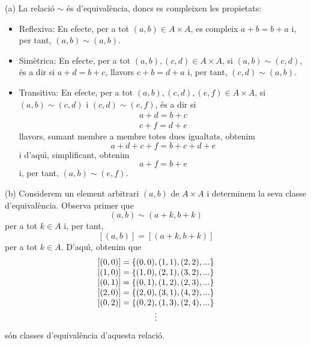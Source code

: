 \begin{solucio}
(a) La relaci\'{o} $\sim $ \'{e}s d'equival\`{e}ncia, doncs es compleixen
les propietats:

\begin{itemize}
\item Reflexiva: En efecte, per a tot $(a,b)\in A\times A$, es compleix $%
a+b=b+a$ i, per tant, $(a,b)\sim (a,b)$.

\item Sim\`{e}trica: En efecte, per a tot $(a,b),(c,d)\in A\times A$, si $%
(a,b)\sim (c,d)$, \'{e}s a dir si $a+d=b+c$, llavors $c+b=d+a$ i, per tant, $%
(c,d)\sim (a,b)$.

\item Transitiva: En efecte, per a tot $(a,b),(c,d),(e,f)\in A\times A$, si $%
(a,b)\sim (c,d)$ i $(c,d)\sim (e,f)$, \'{e}s a dir si%
\begin{equation*}
\begin{array}{c}
a+d=b+c \\
c+f=d+e%
\end{array}%
\end{equation*}%
llavors, sumant membre a membre totes dues igualtats, obtenim%
\begin{equation*}
a+d+c+f=b+c+d+e
\end{equation*}%
i d'aqu\'{\i}, simplificant, obtenim%
\begin{equation*}
a+f=b+e
\end{equation*}%
i, per tant, $(a,b)\sim (e,f)$.
\end{itemize}

(b) Considerem un element arbitrari $(a,b)$ de $A\times A$ i determinem la
seva classe d'equival\`{e}ncia. Observa primer que%
\begin{equation*}
(a,b)\sim (a+k,b+k)
\end{equation*}%
per a tot $k\in A$ i, per tant,%
\begin{equation*}
\left[ (a,b)\right] =\left[ (a+k,b+k)\right]
\end{equation*}%
per a tot $k\in A$. D'aqu\'{\i}, obtenim que%
\begin{equation*}
\begin{array}{l}
\left[ (0,0)\right] =\left\{ (0,0),(1,1),(2,2),...\right\} \\
\left[ (1,0)\right] =\left\{ (1,0),(2,1),(3,2),...\right\} \\
\left[ (0,1)\right] =\left\{ (0,1),(1,2),(2,3),...\right\} \\
\left[ (2,0)\right] =\left\{ (2,0),(3,1),(4,2),...\right\} \\
\left[ (0,2)\right] =\left\{ (0,2),(1,3),(2,4),...\right\} \\
\multicolumn{1}{c}{\vdots}%
\end{array}%
\end{equation*}%
s\'{o}n classes d'equival\`{e}ncia d'aquesta relaci\'{o}.


\end{solucio}
